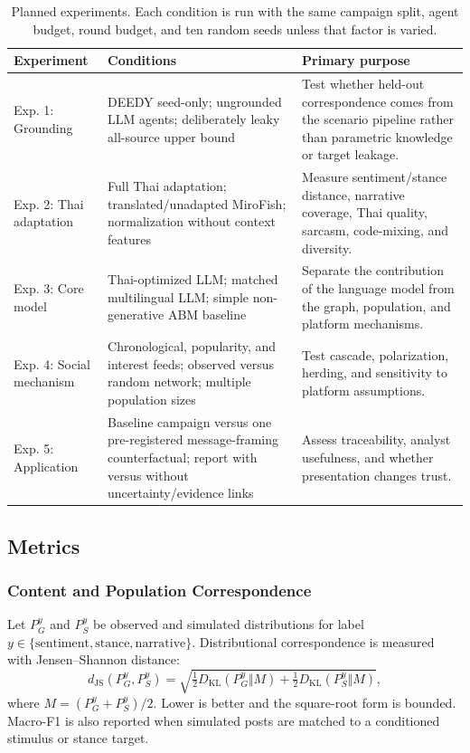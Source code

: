 \documentclass[conference]{IEEEtran}
\begin{document}
\begin{table}[t]
\caption{Planned experiments. Each condition is run with the same campaign
split, agent budget, round budget, and ten random seeds unless that factor is
varied.}
\label{tab:experiments}
\centering
\footnotesize
\begin{tabular}{@{}p{}p{}p{}@{}}
\toprule
Experiment & Conditions & Primary purpose \\
\midrule
Exp. 1: Grounding & DEEDY seed-only; ungrounded LLM agents; deliberately leaky
all-source upper bound & Test whether held-out correspondence comes from the
scenario pipeline rather than parametric knowledge or target leakage. \\
Exp. 2: Thai adaptation & Full Thai adaptation; translated/unadapted MiroFish;
normalization without context features & Measure sentiment/stance distance,
narrative coverage, Thai quality, sarcasm, code-mixing, and diversity. \\
Exp. 3: Core model & Thai-optimized LLM; matched multilingual LLM; simple
non-generative ABM baseline & Separate the contribution of the language model
from the graph, population, and platform mechanisms. \\
Exp. 4: Social mechanism & Chronological, popularity, and interest feeds;
observed versus random network; multiple population sizes & Test cascade,
polarization, herding, and sensitivity to platform assumptions. \\
Exp. 5: Application & Baseline campaign versus one pre-registered
message-framing
counterfactual; report with versus without uncertainty/evidence links & Assess
traceability, analyst usefulness, and whether presentation changes trust. \\
\bottomrule
\end{tabular}
\end{table}

\subsection{Metrics}

\subsubsection{Content and Population Correspondence}

Let $P_G^y$ and $P_S^y$ be observed and simulated distributions for label
$y\in\{\text{sentiment},\text{stance},\text{narrative}\}$. Distributional
correspondence is measured with Jensen--Shannon distance:
\begin{equation}
 d_{\mathrm{JS}}(P_G^y,P_S^y)=
 \sqrt{\tfrac{1}{2}D_{\mathrm{KL}}(P_G^y\Vert M)+
 \tfrac{1}{2}D_{\mathrm{KL}}(P_S^y\Vert M)},
\end{equation}
where $M=(P_G^y+P_S^y)/2$. Lower is better and the square-root form is bounded.
Macro-F1 is also reported when simulated posts are matched to a conditioned
stimulus or stance target.
\end{document}
